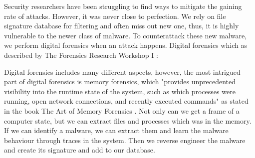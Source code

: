 Security researchers have been struggling to find ways to mitigate the gaining rate of attacks. However, it was never close to perfection. We rely on file signature database for filtering and often miss out new one, thus, it is highly vulnerable to the newer class of malware. To counterattack these new malware, we perform digital forensics when an attack happens. Digital forensics which as described by The Forensics Research Workshop I \cite{roadmap}:



Digital forensics includes many different aspects, however, the most intrigued part of digital forensics is memory forensics, which "provides unprecedented visibility into the runtime state of the system, such as which processes were running, open network connections, and recently executed commands" as stated in the book The Art of Memory Forensics \cite{ligh2014art}. Not only can we get a frame of a computer state, but we can extract files and processes which was in the memory. If we can identify a malware, we can extract them and learn the malware behaviour through traces in the system. Then we reverse engineer the malware and create its signature and add to our database.

